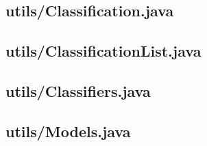 \documentclass{article}
\begin{document}
\begin{appendices}
\begin{subappendices}
        \pagebreak
        \subsection{utils/Classification.java}
        

        \pagebreak
        \subsection{utils/ClassificationList.java}
        

        \pagebreak
        \subsection{utils/Classifiers.java}
        

        \pagebreak
        \subsection{utils/Models.java}
        
    \end{subappendices}
\end{appendices}

\end{document}
